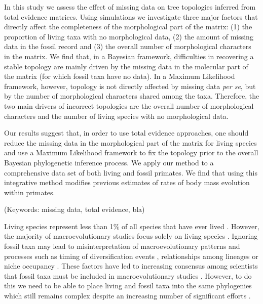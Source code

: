 \documentclass[12pt,letterpaper]{article}
\begin{document}
In this study we assess the effect of missing data on tree topologies inferred from total evidence matrices.
Using simulations we investigate three major factors that directly affect the completeness of the morphological part of the matrix:
(1) the proportion of living taxa with no morphological data,
(2) the amount of missing data in the fossil record and
(3) the overall number of morphological characters in the matrix.
We find that, in a Bayesian framework, difficulties in recovering a stable topology are mainly driven by the missing data in the molecular part of the matrix (for which fossil taxa have no data).
In a Maximum Likelihood framework, however, topology is not directly affected by missing data \textit{per se}, but by the number of morphological characters shared among the taxa.
Therefore, the two main drivers of incorrect topologies are the overall number of morphological characters and the number of living species with no morphological data.

Our results suggest that, in order to use total evidence approaches, one should reduce the missing data in the morphological part of the matrix for living species and use a Maximum Likelihood framework to fix the topology prior to the overall Bayesian phylogenetic inference process.
We apply our method to a comprehensive data set of both living and fossil primates. %
We find that using this integrative method modifies previous estimates of rates of body mass evolution within primates.

\noindent (Keywords: missing data, total evidence, bla)\\

\vspace{1.5in}

\newpage 

Living species represent less than 1\% of all species that have ever lived \citep{novacek1992ext,raup1993extinction}.
However, the majority of macroevolutionary studies focus solely on living species \citep{cooperwhat2009,meredithimpacts2011,healyecology2014}. %
Ignoring fossil taxa may lead to misinterpretation of macroevolutionary patterns and processes such as timing of diversification events \citep[e.g.][]{pyrondivergence2011}, relationships among lineages \citep[e.g.][]{manosphylogeny2007} or niche occupancy \citep[e.g.][]{pearmanniche2008}.
These factors have led to increasing consensus among scientists that fossil taxa must be included in macroevolutionary studies \citep{jacksonwhat2006,quentaldiversity2010,dietlconservation2011,slaterunifying2013,fritzdiversity2013}.
However, to do this we need to be able to place living and fossil taxa into the same phylogenies which still remains complex despite an increasing number of significant efforts \citep{pyrondivergence2011,ronquista2012,schragocombining2013}. %
\end{document}
